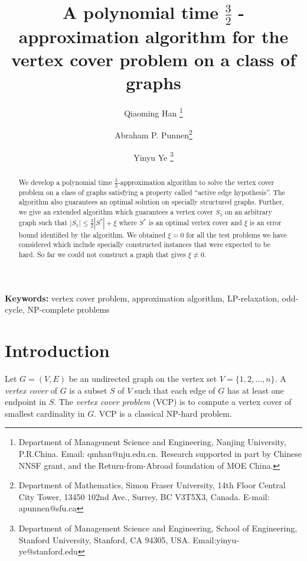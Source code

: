 \documentclass[12pt]{article}
\begin{document}
\title{A polynomial time $\frac 3 2$ -approximation algorithm for the vertex cover
 problem on a class of graphs}
\author{Qiaoming Han
\thanks{Department of Management Science and
Engineering, Nanjing University, P.R.China. Email: qmhan@nju.edu.cn.
Research supported in part by Chinese NNSF grant, and the Return-from-Abroad foundation of MOE China.}  \and
Abraham P. Punnen\thanks{Department of Mathematics, Simon Fraser
University, 14th Floor Central City Tower, 13450 102nd Ave., Surrey,
BC V3T5X3, Canada. E-mail: apunnen@sfu.ca} \and Yinyu Ye
\thanks{Department of Management Science and Engineering,
School of Engineering, Stanford University, Stanford, CA 94305,
USA. Email:yinyu-ye@stanford.edu}}
\date{}
\maketitle
\begin{abstract}
We develop a polynomial time $\frac{3}{2}$-approximation algorithm
to solve the vertex cover problem on a class of graphs satisfying
a property called ``active edge hypothesis''.
The algorithm also guarantees an
optimal solution on specially structured graphs. Further, we give
an extended algorithm which guarantees a vertex cover $S_1$ on an
arbitrary graph such that $|S_1|\leq \frac{3}{2} |S^*|+\xi$ where
$S^*$ is an optimal vertex cover and $\xi$ is an error bound
identified by the algorithm. We obtained $\xi = 0$ for all the
test problems we have considered which include specially
constructed instances that were expected to be hard. So far we could not construct a graph that gives $\xi \not= 0$.
\end{abstract}
{\bf Keywords:} vertex cover problem, approximation algorithm,
LP-relaxation, odd-cycle, NP-complete problems
\par

\newpage
\section{Introduction}
Let $G=(V, E)$ be an undirected graph on the vertex set
$V=\{1,2,\ldots ,n\}$. A {\it vertex cover} of $G$ is  a subset $S$
of $V$ such that each edge of $G$ has at least one endpoint in $S$.
The {\it vertex cover problem} (VCP) is to compute a vertex cover of
smallest
cardinality in $G$. VCP is a classical NP-hard problem.

\vskip 5pt
\end{document}
